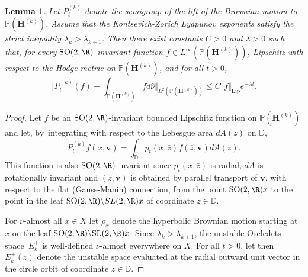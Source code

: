 \documentclass[JEP,XML,SOM,Unicode,published]{cedram}
\theoremstyle{plain}
\newtheorem{lemma}[thm]{Lemma}
\theoremstyle{definition}
\numberwithin{equation}{subsection}
\newcommand\bD{\mathbb{D}}
\newcommand\bP{\mathbb{P}}
\newcommand{\SL}{\mathrm{SL}}
\newcommand{\SO}{\mathrm{SO}}
\newcommand{\bfH}{\boldsymbol{H}}
\newcommand{\bfv}{\boldsymbol{v}}
\begin{document}
\begin{lemma}
\label{lemma:exp}
Let ${P^{(k)}_t}$ denote the semigroup of the lift of the Brownian motion to $\bP(\bfH^{(k)})$. Assume
that the Kontsevich-Zorich Lyapunov exponents satisfy the strict inequality $\lambda_k >\lambda_{k+1}$. Then there exist constants $C>0$ and $\lambda>0$ such that,
for every $\SO(2, \R)$-invariant function $f\in L^\infty(\bP(\bfH^{(k)}))$, Lipschitz with respect to the Hodge metric on $\bP(\bfH^{(k)})$, and for all $t>0$,
\[
\biggl\Vert P^{(k)}_t (f) - \int_{\bP(\bfH^{(k)})} f d\hat{\nu} \biggr\Vert_{L^2(\bP(\bfH^{(k)}))} \leq C \Vert f \Vert_\mathrm{Lip} e^{-\lambda t}.
\]
\end{lemma}
\begin{proof}
Let $f$ be an $\SO(2,\R)$-invariant bounded Lipschitz function on $\bP(\bfH^{(k)})$ and let, by~integrating with respect to the Lebesgue area $dA(z)$ on $\bD$,
\[
P^{(k)}_t f (x, \bfv) = \int_\bD p_t(x,\bar z) f(\bar z,\bfv) dA(z).
\]
This function is also $\SO(2,\R)$-invariant since $p_t(x,\bar z)$ is radial, $dA$ is rotationally invariant and
$(\bar z,\bfv)$ is obtained by parallel transport of $\bfv$, with respect to the flat (Gauss-Manin) connection, from the point $\SO(2,\R)x$ to the point in the leaf $\SO(2,\R)\backslash SL(2,\R)x$ of coordinate $z\in \bD$.

For $\nu$-almost all $x \in X$ let
$\rho_x$ denote the hyperbolic Brownian motion starting
at $x$ on the leaf $\SO(2, \R) \backslash \SL(2, \R)x$.
Since $\lambda_{k} > \lambda_{k+1}$, the unstable Oseledets space~$E^+_k$ is well-defined $\nu$-almost everywhere on $X$. For all $t >0$, let then $E^+_k(z)$ denote the
unstable space evaluated at the radial outward unit vector in the circle orbit of coordinate $z\in \bD$.


\end{proof}
\end{document}
